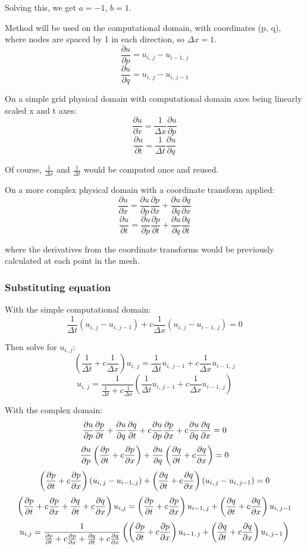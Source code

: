\documentclass[a4paper]{article}
\begin{document}
Solving this, we get $a = -1$, $b = 1$.

Method will be used on the computational domain, with coordinates (p, q), where nodes are spaced by 1 in each direction, so $\Delta x = 1$.
$$\frac{\partial u}{\partial p} = u_{i, \,j} - u_{i-1, \,j}$$
$$\frac{\partial u}{\partial q} = u_{i, \,j} - u_{i, \,j-1}$$

On a simple grid physical domain with computational domain axes being linearly scaled x and t axes:
$$\frac{\partial u}{\partial x} = \frac{1}{\Delta x} \frac{\partial u}{\partial p}$$
$$\frac{\partial u}{\partial t} = \frac{1}{\Delta t} \frac{\partial u}{\partial q}$$

Of course, $\frac{1}{\Delta x}$ and $\frac{1}{\Delta t}$ would be computed once and reused.

On a more complex physical domain with a coordinate transform applied:
$$ \frac{\partial u}{\partial x} = \frac{\partial u}{\partial p}\frac{\partial p}{\partial x} + \frac{\partial u}{\partial q}\frac{\partial q}{\partial x} $$
$$\frac{\partial u}{\partial t} = \frac{\partial u}{\partial p}\frac{\partial p}{\partial t} + \frac{\partial u}{\partial q}\frac{\partial q}{\partial t}$$

where the derivatives from the coordinate transforms would be previously calculated at each point in the mesh.

\subsubsection{Substituting equation}

With the simple computational domain:
$$\frac{1}{\Delta t} (u_{i, \,j} - u_{i, \,j-1}) + c \frac{1}{\Delta x} (u_{i, \,j} - u_{i-1, \,j}) = 0$$

Then solve for $u_{i, \,j}$:
$$(\frac{1}{\Delta t} + c\frac{1}{\Delta x})  u_{i, \,j} = \frac{1}{\Delta t}  u_{i, \,j-1} + c \frac{1}{\Delta x}  u_{i-1, \,j}$$
$$u_{i, \,j} = \frac{1}{\frac{1}{\Delta t} + c\frac{1}{\Delta x}} \left(\frac{1}{\Delta t} u_{i, \,j-1} + c \frac{1}{\Delta x} u_{i-1, \,j}\right)$$


With the complex domain:
$$ \frac{\partial u}{\partial p}\frac{\partial p}{\partial t}  +  \frac{\partial u}{\partial q}\frac{\partial q}{\partial t}  + c\frac{\partial u}{\partial p}\frac{\partial p}{\partial x}  +  c\frac{\partial u}{\partial q}\frac{\partial q}{\partial x} = 0  $$
$$ \frac{\partial u}{\partial p}\left(\frac{\partial p}{\partial t} + c\frac{\partial p}{\partial x}\right) + \frac{\partial u}{\partial q}\left(\frac{\partial q}{\partial t}  + c \frac{\partial q}{\partial x}\right) = 0  $$
$$ \left(\frac{\partial p}{\partial t} + c\frac{\partial p}{\partial x}\right) (u_{i, \,j} - u_{i-1, \,j}) + \left(\frac{\partial q}{\partial t}  + c \frac{\partial q}{\partial x}\right) (u_{i, \,j} - u_{i, \,j-1}) = 0  $$
$$ \left(\frac{\partial p}{\partial t} + c\frac{\partial p}{\partial x} + \frac{\partial q}{\partial t}  + c \frac{\partial q}{\partial x}\right) u_{i, j} = \left(\frac{\partial p}{\partial t} + c\frac{\partial p}{\partial x}\right) u_{i-1, \,j} + \left(\frac{\partial q}{\partial t}  + c \frac{\partial q}{\partial x}\right) u_{i, \,j-1} $$
$$ u_{i, j} = \frac{1}{\frac{\partial p}{\partial t} + c\frac{\partial p}{\partial x} + \frac{\partial q}{\partial t}  + c \frac{\partial q}{\partial x}} \left(\left(\frac{\partial p}{\partial t} + c\frac{\partial p}{\partial x}\right) u_{i-1, \,j} + \left(\frac{\partial q}{\partial t}  + c \frac{\partial q}{\partial x}\right) u_{i, \,j-1}\right) $$
\end{document}

